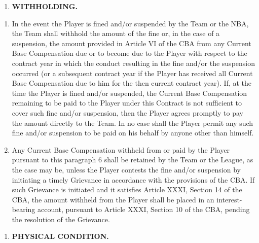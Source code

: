 \documentclass[
]{book}
\providecommand{\tightlist}{%
  \setlength{\itemsep}{0pt}\setlength{\parskip}{0pt}}
\begin{document}
\begin{enumerate}
\def\labelenumi{\arabic{enumi}.}
\setcounter{enumi}{5}
\tightlist
\item
  \textbf{WITHHOLDING.}
\end{enumerate}

\begin{enumerate}
\def\labelenumi{(\alph{enumi})}
\tightlist
\item
  In the event the Player is fined and/or suspended by the Team or the NBA, the Team shall withhold the amount of the fine or, in the case of a suspension, the amount provided in Article VI of the CBA from any Current Base Compensation due or to become due to the Player with respect to the contract year in which the conduct resulting in the fine and/or the suspension occurred (or a subsequent contract year if the Player has received all Current Base Compensation due to him for the then current contract year). If, at the time the Player is fined and/or suspended, the Current Base Compensation remaining to be paid to the Player under this Contract is not sufficient to cover such fine and/or suspension, then the Player agrees promptly to pay the amount directly to the Team. In no case shall the Player permit any such fine and/or suspension to be paid on his behalf by anyone other than himself.
\item
  Any Current Base Compensation withheld from or paid by the Player pursuant to this paragraph 6 shall be retained by the Team or the League, as the case may be, unless the Player contests the fine and/or suspension by initiating a timely Grievance in accordance with the provisions of the CBA. If such Grievance is initiated and it satisfies Article XXXI, Section 14 of the CBA, the amount withheld from the Player shall be placed in an interest-bearing account, pursuant to Article XXXI, Section 10 of the CBA, pending the resolution of the Grievance.
\end{enumerate}

\begin{enumerate}
\def\labelenumi{\arabic{enumi}.}
\setcounter{enumi}{6}
\tightlist
\item
  \textbf{PHYSICAL CONDITION.}
\end{enumerate}
\end{document}
